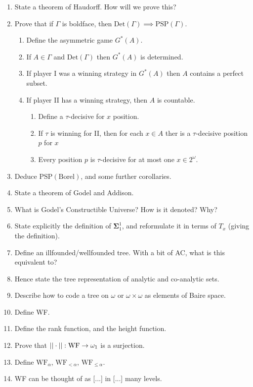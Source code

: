 \documentclass[]{article}
\newcommand{\om}{\omega}
\newcommand{\bosig}{\bm{\Sigma}}
\newcommand{\Det}{\textrm{Det}}
\newcommand{\psp}{\textrm{PSP}}
\newcommand{\wf}{\textrm{WF}}
\begin{document}
\begin{enumerate}
    \item State a theorem of Haudorff. How will we prove this?
    \item Prove that if $\Gamma$ is boldface, then $\Det(\Gamma)\implies \psp(\Gamma)$.
    \begin{enumerate}
        \item Define the asymmetric game $G^\ast(A)$.
        \item If $A \in \Gamma$ and $\Det(\Gamma)$ then $G^\ast(A)$ is determined.
        \item If player I was a winning strategy in $G^\ast(A)$ then $A$ contains a perfect subset.
        \item If player II has a winning strategy, then $A$ is countable.
        \begin{enumerate}
            \item Define a $\tau$-decisive for $x$ position.
            \item If $\tau$ is winning for II, then for each $x \in A$ ther is a $\tau$-decisive position $p$ for $x$
            \item Every position $p$ is $\tau$-decisive for at most one $x \in 2^\om$.
        \end{enumerate}
    \end{enumerate}
    \item Deduce $\psp(\textrm{Borel})$, and some further corollaries.
    \item State a theorem of Godel and Addison.
    \item What is Godel's Constructible Universe? How is it denoted? Why?
    \item State explicitly the definition of $\bosig^1_1$, and reformulate it in terms of $T_x$ (giving the definition).
    \item Define an illfounded/wellfounded tree. With a bit of AC, what is this equivalent to?
    \item Hence state the tree representation of analytic and co-analytic sets.
    \item Describe how to code a tree on $\om$ or $\om\times\om$ as elements of Baire space.
    \item Define WF.
    \item Define the rank function, and the height function.
    \item Prove that $||\cdot||:\wf \ra \om_1$ is a surjection.
    \item Define $\wf_\alpha$, $\wf_{<\alpha}$, $\wf_{\le \alpha}$.
    \item WF can be thought of as [...] in [...] many levels.

\end{enumerate}
\end{document}
